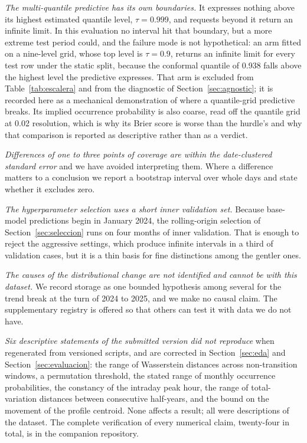 \documentclass[preprint,3p,times]{elsarticle}
\begin{document}
\emph{The multi-quantile predictive has its own boundaries.} It expresses nothing above its highest estimated quantile level, $\tau=0.999$, and requests beyond it return an infinite limit. In this evaluation no interval hit that boundary, but a more extreme test period could, and the failure mode is not hypothetical: an arm fitted on a nine-level grid, whose top level is $\tau=0.9$, returns an infinite limit for every test row under the static split, because the conformal quantile of 0.938 falls above the highest level the predictive expresses. That arm is excluded from Table~\ref{tab:escalera} and from the diagnostic of Section~\ref{sec:agnostic}; it is recorded here as a mechanical demonstration of where a quantile-grid predictive breaks. Its implied occurrence probability is also coarse, read off the quantile grid at 0.02 resolution, which is why its Brier score is worse than the hurdle's and why that comparison is reported as descriptive rather than as a verdict.

\emph{Differences of one to three points of coverage are within the date-clustered standard error} and we have avoided interpreting them. Where a difference matters to a conclusion we report a bootstrap interval over whole days and state whether it excludes zero.

\emph{The hyperparameter selection uses a short inner validation set.} Because base-model predictions begin in January 2024, the rolling-origin selection of Section~\ref{sec:seleccion} runs on four months of inner validation. That is enough to reject the aggressive settings, which produce infinite intervals in a third of validation cases, but it is a thin basis for fine distinctions among the gentler ones.

\emph{The causes of the distributional change are not identified and cannot be with this dataset.} We record storage as one bounded hypothesis among several for the trend break at the turn of 2024 to 2025, and we make no causal claim. The supplementary registry is offered so that others can test it with data we do not have.

\emph{Six descriptive statements of the submitted version did not reproduce} when regenerated from versioned scripts, and are corrected in Section~\ref{sec:eda} and Section~\ref{sec:evaluacion}: the range of Wasserstein distances across non-transition windows, a permutation threshold, the stated range of monthly occurrence probabilities, the constancy of the intraday peak hour, the range of total-variation distances between consecutive half-years, and the bound on the movement of the profile centroid. None affects a result; all were descriptions of the dataset. The complete verification of every numerical claim, twenty-four in total, is in the companion repository.
\end{document}
